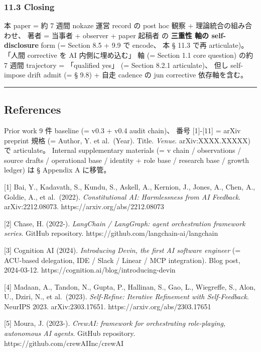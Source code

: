 \documentclass[
]{article}
\begin{document}
\subsubsection{11.3 Closing}\label{closing}

本 paper = 約 7 週間 nokaze 運営 record の post hoc 観察 +
理論統合の組み合わせ、 著者 = 当事者 + observer + paper 起稿者 の
\textbf{三重性 軸の self-disclosure} form (= Section 8.5 + 9.9 で
encode、 本 § 11.3 で再 articulate)。 「人間 corrective を AI
内側に埋め込む」 軸 (= Section 1.1 core question) の約 7 週間 trajectory
= 「qualified yes」 (= Section 8.2.1 articulate)、 但し self-impose
drift admit (= § 9.8) + 自走 cadence の jun corrective 依存軸を含む。

\begin{center}\rule{0.5\linewidth}{0.5pt}\end{center}

\subsection{References}\label{references}

Prior work 9 件 baseline (= v0.3 + v0.4 audit chain)、 番号
{[}1{]}-{[}11{]} = arXiv preprint 規格 (= Author, Y. et al.~(Year).
Title. \emph{Venue}. arXiv:XXXX.XXXXX) で articulate。 Internal
supplementary materials (= v chain / observations / source drafts /
operational base / identity + role base / research base / growth ledger)
は § Appendix A に移管。

{[}1{]} Bai, Y., Kadavath, S., Kundu, S., Askell, A., Kernion, J.,
Jones, A., Chen, A., Goldie, A., et al.~(2022). \emph{Constitutional AI:
Harmlessness from AI Feedback}. arXiv:2212.08073.
https://arxiv.org/abs/2212.08073

{[}2{]} Chase, H. (2022-). \emph{LangChain / LangGraph: agent
orchestration framework series}. GitHub repository.
https://github.com/langchain-ai/langchain

{[}3{]} Cognition AI (2024). \emph{Introducing Devin, the first AI
software engineer} (= ACU-based delegation, IDE / Slack / Linear / MCP
integration). Blog post, 2024-03-12.
https://cognition.ai/blog/introducing-devin

{[}4{]} Madaan, A., Tandon, N., Gupta, P., Hallinan, S., Gao, L.,
Wiegreffe, S., Alon, U., Dziri, N., et al.~(2023). \emph{Self-Refine:
Iterative Refinement with Self-Feedback}. NeurIPS 2023.
arXiv:2303.17651. https://arxiv.org/abs/2303.17651

{[}5{]} Moura, J. (2023-). \emph{CrewAI: framework for orchestrating
role-playing, autonomous AI agents}. GitHub repository.
https://github.com/crewAIInc/crewAI
\end{document}
